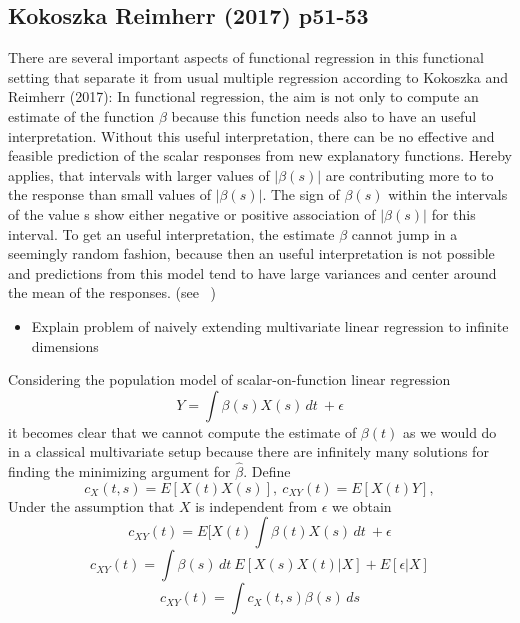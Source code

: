 \documentclass[11pt,twoside,a4paper]{article}
\begin{document}
\subsection{Kokoszka Reimherr (2017) p51-53}
There are several important aspects of functional regression in this functional setting that separate it from usual multiple regression according to Kokoszka and Reimherr (2017): In functional regression, the aim is not only to compute an estimate of the function $\beta$ because this function needs also to have an useful interpretation. Without this useful interpretation, there can be no effective and feasible prediction of the scalar responses from new explanatory functions. Hereby applies, that intervals with larger values of $|\beta(s)|$ are contributing more to to the response than small values of  $|\beta(s)|$. The sign of $\beta(s)$ within the intervals of the value s show either negative or positive association of  $|\beta(s)|$ for this interval. To get an useful interpretation, the estimate $\beta$ cannot jump in a seemingly random fashion, because then an useful interpretation is not possible and predictions from this model tend to have large variances and center around the mean of the responses. (see ~\cite{kokoszka_introduction_2017})
	
	\begin{itemize}
		\item Explain problem of naively extending multivariate linear regression to infinite dimensions
	\end{itemize}
	Considering the population model of scalar-on-function linear regression
	\begin{equation}
     Y =  \int \beta(s)X(s) \,dt \ +\epsilon
    \end{equation}
    it becomes clear that we cannot compute the estimate of $\beta(t)$ as we would do in a classical multivariate setup because there are infinitely many solutions for finding the minimizing argument for $\hat{\beta}$. Define 
    \begin{equation}
  	c_{X}(t,s) = E[X(t)X(s)],\: c_{XY}(t) = E[X(t)Y], 
    \end{equation}
   Under the assumption that $X$ is independent from $\epsilon$ we obtain
   \begin{equation}
     c_{XY}(t) = E[X(t)\int \beta(t)X(s) \,dt \ +\epsilon
   \end{equation}
    \begin{equation}
     c_{XY}(t) = \int \beta(s)\,dt \: E[X(s)X(t)| X] + E[\epsilon |X]
  	\end{equation}
   	\begin{equation}
    	c_{XY}(t) = \int c_{X}(t,s) \beta(s) \,ds 
   \end{equation}
   
\end{document}
